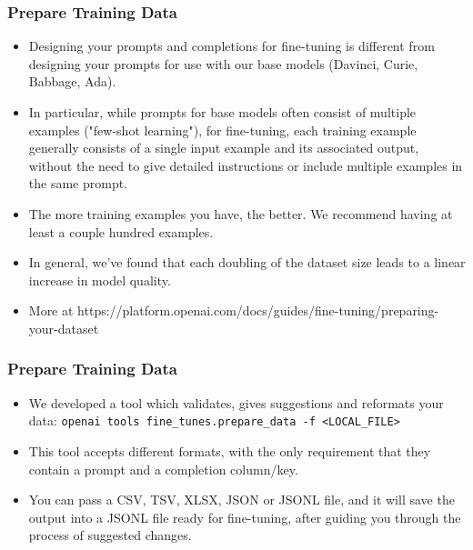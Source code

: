 \begin{frame}[fragile]\frametitle{Prepare Training Data}

\begin{itemize}
\item Designing your prompts and completions for fine-tuning is different from designing your prompts for use with our base models (Davinci, Curie, Babbage, Ada). 
\item In particular, while prompts for base models often consist of multiple examples ("few-shot learning"), for fine-tuning, each training example generally consists of a single input example and its associated output, without the need to give detailed instructions or include multiple examples in the same prompt.
\item The more training examples you have, the better. We recommend having at least a couple hundred examples. 
\item In general, we've found that each doubling of the dataset size leads to a linear increase in model quality.
\item More at https://platform.openai.com/docs/guides/fine-tuning/preparing-your-dataset
\end{itemize}	 


\end{frame}


\begin{frame}[fragile]\frametitle{Prepare Training Data}

\begin{itemize}
\item We developed a tool which validates, gives suggestions and reformats your data: \lstinline|openai tools fine_tunes.prepare_data -f <LOCAL_FILE>|
\item This tool accepts different formats, with the only requirement that they contain a prompt and a completion column/key. 
\item You can pass a CSV, TSV, XLSX, JSON or JSONL file, and it will save the output into a JSONL file ready for fine-tuning, after guiding you through the process of suggested changes.
\end{itemize}	 


\end{frame}


